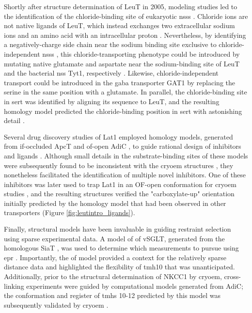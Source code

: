 Shortly after structure determination of LeuT in 2005, modeling studies led to the identification of the chloride-binding site of eukaryotic \gls{nss}s \citep*{Forrest2007, Zomot2007}. Chloride ions are not native ligands of LeuT, which instead exchanges two extracellular sodium ions and an amino acid with an intracellular proton \citep*{Zhao2010}. Nevertheless, by identifying a negatively-charge side chain near the sodium binding site exclusive to chloride-independent \gls{nss}s \citep*{Beuming2006}, this chloride-transporting phenotype could be introduced by mutating native glutamate and aspartate near the sodium-binding site of LeuT and the bacterial \gls{nss} Tyt1, respectively \citep*{Zomot2007}. Likewise, chloride-independent transport could be introduced in the \gls{gaba} transporter GAT1 by replacing the serine in the same position with a glutamate. In parallel, the chloride-binding site in \gls{sert} was identified by aligning its sequence to LeuT, and the resulting homology model predicted the chloride-binding position in \gls{sert} with astonishing detail \citep*{Forrest2008}.

Several drug discovery studies of Lat1 employed homology models, generated from \gls{if}-occluded ApcT \citep*{Shaffer2009} and \gls{of}-open AdiC \citep*{Gao2009}, to guide rational design of inhibitors and ligands \citep*{Geier2013, Napolitano2017, Singh2018, Ylikangas2014}. Although small details in the substrate-binding sites of these models were subsequently found to be inconsistent with the \gls{cryoem} structures \citep*{Lee2019, Yan2021, Yan2019}, they nonetheless facilitated the identification of multiple novel inhibitors. One of these inhibitors was later used to trap Lat1 in an OF-open conformation for \gls{cryoem} studies \citep*{Yan2021}, and the resulting structures verified the "carboxylate-up" orientation initially predicted by the homology model that had been observed in other transporters (Figure \ref{fig:leutintro_ligands}).

Finally, structural models have been invaluable in guiding restraint selection using sparse experimental data. A model of \gls{of} vSGLT, generated from the homologous SiaT \citep*{Wahlgren2018}, was used to determine which measurements to pursue using \gls{epr} \citep*{Paz2018}. Importantly, the \gls{of} model provided a context for the relatively sparse distance data and highlighted the flexibility of \gls{tmh}10 that was unanticipated. Additionally, prior to the structural determination of NKCC1 by \gls{cryoem}, cross-linking experiments were guided by computational models generated from AdiC; the conformation and register of \gls{tmh}s 10-12 predicted by this model was subsequently validated by \gls{cryoem} \citep*{Monette2014, Yang2020}.

